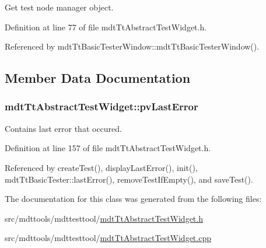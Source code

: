 Get test node manager object. 



Definition at line 77 of file mdt\-Tt\-Abstract\-Test\-Widget.\-h.



Referenced by mdt\-Tt\-Basic\-Tester\-Window\-::mdt\-Tt\-Basic\-Tester\-Window().



\subsection{Member Data Documentation}
\hypertarget{classmdt_tt_abstract_test_widget_a8faf8ab17f8a7f50d7d3a143b4e4624f}{
\subsubsection[{pv\-Last\-Error}]{ mdt\-Tt\-Abstract\-Test\-Widget\-::pv\-Last\-Error\hspace{0.3cm}{\ttfamily [protected]}}}\label{classmdt_tt_abstract_test_widget_a8faf8ab17f8a7f50d7d3a143b4e4624f}


Contains last error that occured. 



Definition at line 157 of file mdt\-Tt\-Abstract\-Test\-Widget.\-h.



Referenced by create\-Test(), display\-Last\-Error(), init(), mdt\-Tt\-Basic\-Tester\-::last\-Error(), remove\-Test\-If\-Empty(), and save\-Test().



The documentation for this class was generated from the following files\-:\begin{DoxyCompactItemize}
\item 
src/mdttools/mdttesttool/\hyperlink{mdt_tt_abstract_test_widget_8h}{mdt\-Tt\-Abstract\-Test\-Widget.\-h}\item 
src/mdttools/mdttesttool/\hyperlink{mdt_tt_abstract_test_widget_8cpp}{mdt\-Tt\-Abstract\-Test\-Widget.\-cpp}\end{DoxyCompactItemize}
